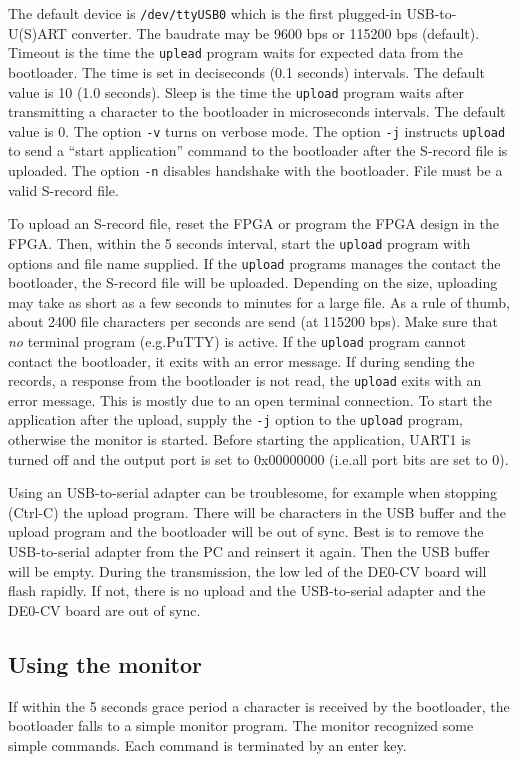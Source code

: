 \documentclass[12pt]{article}
\begin{document}
The default device is \lstinline|/dev/ttyUSB0| which is the first plugged-in USB-to-U(S)ART converter. The baudrate may be 9600 bps or 115200 bps (default). Timeout is the time the \lstinline|uplead| program waits for expected data from the bootloader. The time is set in deciseconds (0.1 seconds) intervals. The default value is 10 (1.0 seconds). Sleep is the time the \lstinline|upload| program waits after transmitting a character to the bootloader in microseconds intervals. The default value is 0. The option \lstinline|-v| turns on verbose mode. The option \lstinline[]|-j| instructs \lstinline|upload| to send a ``start application'' command to the bootloader after the S-record file is uploaded. The option \lstinline|-n| disables handshake with the bootloader. File must be a valid S-record file.

To upload an S-record file, reset the FPGA or program the FPGA design in the FPGA. Then, within the 5 seconds interval, start the \lstinline|upload| program with options and file name supplied. If the \lstinline|upload| programs manages the contact the bootloader, the S-record file will be uploaded. Depending on the size, uploading may take as short as a few seconds to minutes for a large file. As a rule of thumb, about 2400 file characters per seconds are send (at 115200 bps). Make sure that \emph{no} terminal program (e.g.\@ PuTTY) is active. If the \lstinline|upload| program cannot contact the bootloader, it exits with an error message. If during sending the records, a response from the bootloader is not read, the \lstinline|upload| exits with an error message. This is mostly due to an open terminal connection. To start the application after the upload, supply the \lstinline|-j| option to the \lstinline|upload| program, otherwise the monitor is started. Before starting the application, UART1 is turned off and the output port is set to 0x00000000 (i.e.\@ all port bits are set to 0).

Using an USB-to-serial adapter can be troublesome, for example when stopping (Ctrl-C) the upload program. There will be characters in the USB buffer and the upload program and the bootloader will be out of sync. Best is to remove the USB-to-serial adapter from the PC and reinsert it again. Then the USB buffer will be empty. During the transmission, the low led of the DE0-CV board will flash rapidly. If not, there is no upload and the USB-to-serial adapter and the DE0-CV board are out of sync.

\subsection{Using the monitor}
If within the 5 seconds grace period a character is received by the bootloader, the bootloader falls to a simple monitor program. The monitor recognized some simple commands. Each command is terminated by an enter key.
\end{document}
